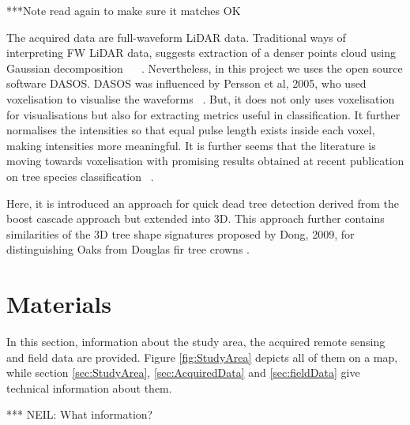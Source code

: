 \documentclass{subfiles}
\begin{document}
{\color{red} ***Note read again to make sure it matches OK}
\par The acquired data are full-waveform LiDAR data. Traditional ways of interpreting FW LiDAR data, suggests extraction of a denser points cloud using Gaussian decomposition ~\cite{Neuenschwander2009} ~\cite{Reitberger2008}. Nevertheless, in this project we uses the open source software DASOS. DASOS was influenced by Persson et al, 2005, who used voxelisation to visualise the waveforms ~\cite{Persson2005}. But, it does not only uses voxelisation for visualisations but also for extracting metrics useful in classification. It further normalises the intensities so that equal pulse length exists inside each voxel, making intensities more meaningful. It is further seems that the literature is moving towards voxelisation with promising results obtained at recent publication on tree species classification ~\cite{Cao2016}. 

Here, it is introduced an approach for quick dead tree detection derived from the boost cascade approach \cite{Viola2001} but extended into 3D. This approach further contains similarities of the 3D tree shape signatures proposed by Dong, 2009, for distinguishing Oaks from Douglas fir tree crowns \cite{Dong2009}. 












\section{Materials}
In this section, information about the study area, the acquired remote sensing and field data are provided. Figure \ref{fig:StudyArea} depicts all of them on a map, while section \ref{sec:StudyArea}, \ref{sec:AcquiredData} and \ref{sec:fieldData} give technical information about them. 

{\color{red} *** NEIL: What information?} 
\end{document}
